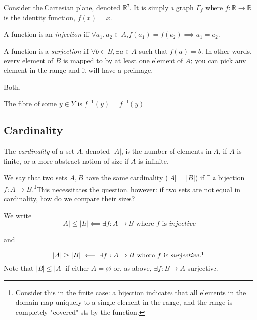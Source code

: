\documentclass[12pt,oneside]{article}
\begin{document}
\begin{example}
  Consider the Cartesian plane, denoted $\mathbb{R}^2$. It is simply a graph $\Gamma_f$ where $f: \mathbb{R} \to \mathbb{R}$ is the identity function, $f(x) = x$.
\end{example}

\begin{definition}[Injective]
  A function is an \emph{injection} iff $\forall a_1, a_2 \in A, f(a_1) = f(a_2) \implies a_1 = a_2$.
\end{definition}

\begin{definition}[Surjective]
  A function is a \emph{surjection} iff $\forall b \in B, \exists a \in A$ such that $f(a) = b$. In other words, every element of $B$ is mapped to by at least one element of $A$; you can pick any element in the range and it will have a preimage.
\end{definition}

\begin{definition}[Bijective]
  Both.
\end{definition}

\begin{definition}[Fibre]
The fibre of some $y \in Y$ is $f^{-1}({y}) = f^{-1}(y)$
\end{definition}

\subsection{Cardinality}
\begin{definition}[Cardinality]
  The \emph{cardinality} of a set $A$, denoted $|A|$, is the number of elements in $A$, if $A$ is finite, or a more abstract notion of size if $A$ is infinite.
\end{definition}

We say that two sets $A, B$ have the same cardinality ($|A|=|B|$) if $\exists$ a bijection $f: A \to B$.\footnote{Consider this in the finite case: a bijection indicates that all elements in the domain map uniquely to a single element in the range, and the range is completely "covered" sts by the function.}This necessitates the question, however: if two sets are not equal in cardinality, how do we compare their sizes?

We write 
\[|A| \leq |B| \impliedby \exists f : A \to B \text{ where } f \text{ is } \textit{injective}\]

and 

\[|A| \geq |B| \impliedby \exists f: A \to B \text{ where } f \text{ is } \textit{surjective.}\footnotemark\] Note that $|B| \leq |A|$ if either $A = \varnothing$ or, as above, $\exists f: B \to A$ surjective.
\end{document}
